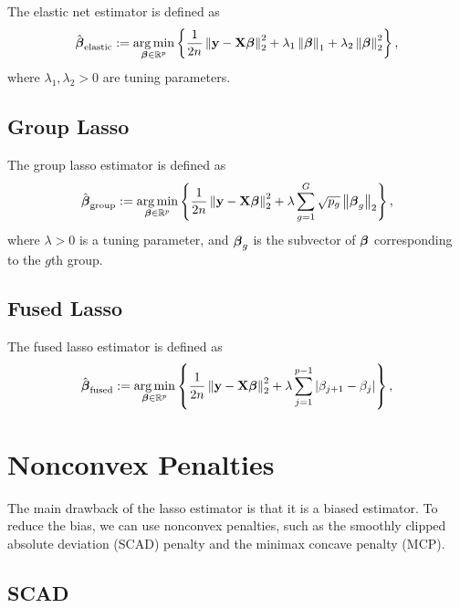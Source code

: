 The elastic net estimator is defined as
\begin{equation*}
	\hat{\boldsymbol{\beta}}_{\text{elastic}}:=\underset{\boldsymbol{\beta}\in\mathbb{R}^{p}}{\arg\min}\left\{\frac{1}{2n}\left\|\mathbf{y}-\mathbf{X}\boldsymbol{\beta}\right\|_{2}^{2}+\lambda_{1}\left\|\boldsymbol{\beta}\right\|_{1}+\lambda_{2}\left\|\boldsymbol{\beta}\right\|_{2}^{2}\right\},
\end{equation*}
where \(\lambda_{1},\lambda_{2}>0\) are tuning parameters.

\subsection{Group Lasso}

The group lasso estimator is defined as
\begin{equation*}
	\hat{\boldsymbol{\beta}}_{\text{group}}:=\underset{\boldsymbol{\beta}\in\mathbb{R}^{p}}{\arg\min}\left\{\frac{1}{2n}\left\|\mathbf{y}-\mathbf{X}\boldsymbol{\beta}\right\|_{2}^{2}+\lambda\sum_{g=1}^{G}\sqrt{p_{g}}\left\|\boldsymbol{\beta}_{g}\right\|_{2}\right\},
\end{equation*}
where \(\lambda>0\) is a tuning parameter, and \(\boldsymbol{\beta}_{g}\) is the subvector of \(\boldsymbol{\beta}\) corresponding to the \(g\)th group.

\subsection{Fused Lasso}

The fused lasso estimator is defined as
\begin{equation*}
	\hat{\boldsymbol{\beta}}_{\text{fused}}:=\underset{\boldsymbol{\beta}\in\mathbb{R}^{p}}{\arg\min}\left\{\frac{1}{2n}\left\|\mathbf{y}-\mathbf{X}\boldsymbol{\beta}\right\|_{2}^{2}+\lambda\sum_{j=1}^{p-1}\left|\beta_{j+1}-\beta_{j}\right|\right\},
\end{equation*}

\section{Nonconvex Penalties}

The main drawback of the lasso estimator is that it is a biased estimator. To reduce the bias, we can use nonconvex penalties, such as the smoothly clipped absolute deviation (SCAD) penalty and the minimax concave penalty (MCP).

\subsection{SCAD}

